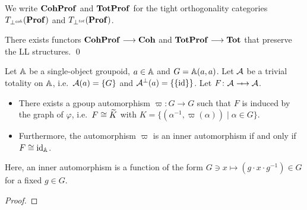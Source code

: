 We write \( \mathbf{CohProf} \) and \( \mathbf{TotProf} \) for the tight orthogonality categories \( T_{\mathrel{\bot}^{\mathit{coh}}}(\mathbf{Prof}) \) and \( T_{\mathrel{\bot}^{\mathit{tot}}}(\mathbf{Prof}) \).

\newcommand{\Coh}{\mathbf{Coh}}
\newcommand{\Tot}{\mathbf{Tot}}
\begin{proposition}
    There exists functors \( \CohProf \longrightarrow \Coh \) and \( \TotProf \longrightarrow \Tot \) that preserve the LL structures.
    \qed
\end{proposition}

\begin{lemma}\label{lem:definability:totality-and-bijection}
    Let \( \mathbb{A} \) be a single-object groupoid, \( a \in \mathbb{A} \) and \( G = \mathbb{A}(a,a) \).
    Let \( \mathcal{A} \) be a trivial totality on \( \mathbb{A} \), i.e.~\( \mathcal{A}(a) = \{ G \} \) and \( \mathcal{A}^{\bot}(a) = \{ \{ \mathrm{id} \} \} \).
    Let \( F \colon \creed \profarrow \creed \).
    \begin{itemize}
        \item There exists a gpoup automorphism \( \varpi \colon G \longrightarrow G \) such that \( F \) is induced by the graph of \( \varphi \), i.e.~\( F \cong \widetilde{K} \) with \( K = \{ (\alpha^{-1}, \varpi(\alpha)) \mid \alpha \in G \} \).
        \item Furthermore, the automorphism \( \varpi \) is an inner automorphism if and only if \( F \cong \mathrm{id}_{\mathbb{A}} \).
    \end{itemize}
    Here, an inner automorphism is a function of the form \( G \ni x \mapsto (g \cdot x \cdot g^{-1}) \in G \) for a fixed \( g \in G \). 
\end{lemma}
\begin{proof}
\end{proof}

